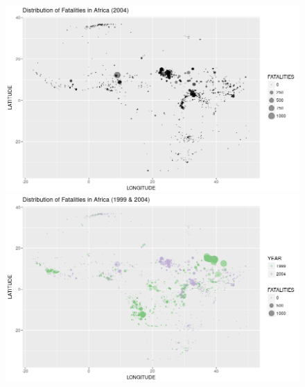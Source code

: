 \documentclass[a4paper, fleqn]{article}
\begin{document}
\begin{itemize}
\begin{figure}[h!]
\includegraphics[width=\linewidth]{./assets/201803220344.png}
\includegraphics[width=\linewidth]{./assets/201803220355.png}
\end{figure}
\end{itemize}
\end{document}

